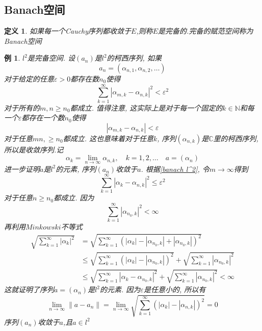 \documentclass[a4paper,11pt]{book}
\newtheorem{definition}{\hspace{2em}定义}[section]
\newtheorem{example}{例}[section]
\begin{document}
\subsection*{Banach空间}
\begin{definition}
  如果每一个Cauchy序列都收敛于$E$,则称$E$是完备的.完备的赋范空间称为Banach空间
\end{definition}
\begin{example}\label{l^2 complete}
  $l^2$是完备空间. 设$(a_n)$是$l^2$的柯西序列, 如果
  \begin{equation*}
    a_n=(\alpha_{n,1},\alpha_{n,2},\dots)
  \end{equation*}
  对于给定的任意$\varepsilon>0$都存在数$n_0$使得
  \begin{equation*}\label{banach l^2}
    \sum_{k=1}^{\infty}|\alpha_{m,k}-\alpha_{n,k}|^2<\varepsilon^2
  \end{equation*}
  对于所有的$m,n\geq n_0$都成立. 值得注意, 这实际上是对于每一个固定的$k\in \mathbb{N}$和每一个$\varepsilon$都存在一个数$n_0$使得
  \begin{equation*}
    |\alpha_{m,k}-\alpha_{n,k}|<\varepsilon
  \end{equation*}
  对于任意$mn,\geq n_0$都成立. 这也意味着对于任意$k$, 序列$(\alpha_{n,k})$是$\mathbb{C}$里的柯西序列, 所以是收敛序列.记
  \begin{equation*}
    \alpha_k=\lim_{n\to\infty}\alpha_{n,k},\quad k=1,2,\dots\quad a=(\alpha_{n})
  \end{equation*}
  进一步证明$a$是$l^2$的元素, 序列$(a_n)$收敛于$a$. 根据\eqref{banach l^2}, 令$m\to \infty$得到
  \begin{equation*}
    \sum_{k=1}^{\infty}|\alpha_k-\alpha_{n,k}|^2\leq\varepsilon^2
  \end{equation*}
  对于任意$n\geq n_0$都成立. 因为
  \begin{equation*}
    \sum_{k=1}^{\infty}|\alpha_{n_0,k}|^2<\infty
  \end{equation*}
  再利用$Minkowski$不等式
  \begin{equation*}
  \begin{split}
     \sqrt{\sum_{k=1}^{\infty}|\alpha_k|^2}&=\sqrt{\sum_{k=1}^{\infty}(|\alpha_k|-|\alpha_{n_0,k}|+|\alpha_{n_0,k}|)^2} \\
       &\leq\sqrt{\sum_{k=1}^{\infty}(|\alpha_k|-|\alpha_{n_0,k}|)^2}+\sqrt{\sum_{k=1}^{\infty}|\alpha_{n_0,k}|^2}\\
       &\leq\sqrt{\sum_{k=1}^{\infty}|\alpha_k-\alpha_{n_0,k}|^2}+\sqrt{\sum_{k=1}^{\infty}|\alpha_{n_0,k}|^2}<\infty
  \end{split}
  \end{equation*}
  这就证明了序列$a=(\alpha_n)$是$l^2$的元素. 因为$\varepsilon$是任意小的, 所以有
  \begin{equation*}
    \lim_{n\to\infty}\|a-a_n\|=\lim_{n\to\infty}\sqrt{\sum_{k=1}^{\infty}(|\alpha_k|-|\alpha_{n,k}|)^2}=0
  \end{equation*}
  序列$(a_n)$收敛于$a$,且$a\in l^2$
\end{example}
\end{document}
